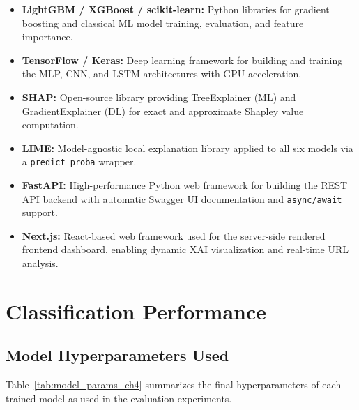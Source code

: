 \begin{itemize}
    \item \textbf{LightGBM / XGBoost / scikit-learn:} Python libraries for gradient boosting and classical ML model training, evaluation, and feature importance.
    \item \textbf{TensorFlow / Keras:} Deep learning framework for building and training the MLP, CNN, and LSTM architectures with GPU acceleration.
    \item \textbf{SHAP:} Open-source library providing TreeExplainer (ML) and GradientExplainer (DL) for exact and approximate Shapley value computation.
    \item \textbf{LIME:} Model-agnostic local explanation library applied to all six models via a \texttt{predict\_proba} wrapper.
    \item \textbf{FastAPI:} High-performance Python web framework for building the REST API backend with automatic Swagger UI documentation and \texttt{async/await} support.
    \item \textbf{Next.js:} React-based web framework used for the server-side rendered frontend dashboard, enabling dynamic XAI visualization and real-time URL analysis.
\end{itemize}

\section{Classification Performance}

\subsection{Model Hyperparameters Used}

Table~\ref{tab:model_params_ch4} summarizes the final hyperparameters of each trained model as used in the evaluation experiments.

